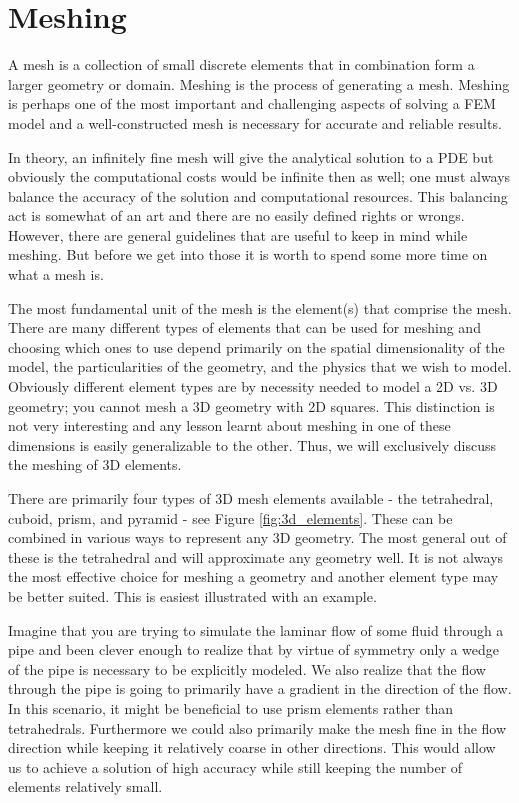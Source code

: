 \section{Meshing}\label{sec:meshing}

A mesh is a collection of small discrete elements that in combination form a larger geometry or domain.
Meshing is the process of generating a mesh.
Meshing is perhaps one of the most important and challenging aspects of solving a FEM model and a well-constructed mesh is necessary for accurate and reliable results.\par

In theory, an infinitely fine mesh will give the analytical solution to a PDE but obviously the computational costs would be infinite then as well; one must always balance the accuracy of the solution and computational resources.
This balancing act is somewhat of an art and there are no easily defined rights or wrongs.
However, there are general guidelines that are useful to keep in mind while meshing.
But before we get into those it is worth to spend some more time on what a mesh is.\par

The most fundamental unit of the mesh is the element(s) that comprise the mesh.
There are many different types of elements that can be used for meshing and choosing which ones to use depend primarily on the spatial dimensionality of the model, the particularities of the geometry, and the physics that we wish to model.
Obviously different element types are by necessity needed to model a 2D vs. 3D geometry; you cannot mesh a 3D geometry with 2D squares.
This distinction is not very interesting and any lesson learnt about meshing in one of these dimensions is easily generalizable to the other.
Thus, we will exclusively discuss the meshing of 3D elements.\par

There are primarily four types of 3D mesh elements available - the tetrahedral, cuboid, prism, and pyramid - see Figure \ref{fig:3d_elements}.
These can be combined in various ways to represent any 3D geometry.
The most general out of these is the tetrahedral and will approximate any geometry well.
It is not always the most effective choice for meshing a geometry and another element type may be better suited.
This is easiest illustrated with an example.\par

Imagine that you are trying to simulate the laminar flow of some fluid through a pipe and been clever enough to realize that by virtue of symmetry only a wedge of the pipe is necessary to be explicitly modeled.
We also realize that the flow through the pipe is going to primarily have a gradient in the direction of the flow.
In this scenario, it might be beneficial to use prism elements rather than tetrahedrals.
Furthermore we could also primarily make the mesh fine in the flow direction while keeping it relatively coarse in other directions.
This would allow us to achieve a solution of high accuracy while still keeping the number of elements relatively small.\par


